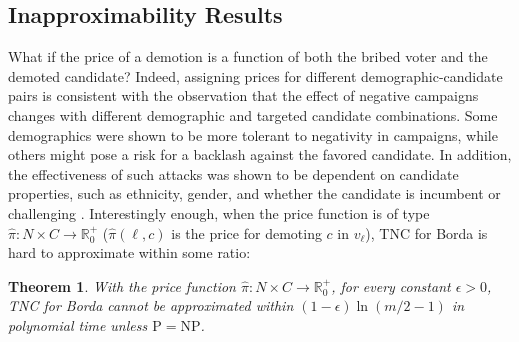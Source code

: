 \documentclass[letterpaper]{article} %
\newtheorem{theorem}{Theorem}
\newcommand{\preals}{\mathbb{R}^{+}_{0}}
\newcommand{\SB}{\textsc{TNC}}
\newcommand{\NP}{\mathrm{NP}}
\newcommand{\Pclass}{\mathrm{P}}
\begin{document}
\subsection{Inapproximability Results \label{inaprox}}
What if the price of a demotion is a function of both the bribed voter and the demoted candidate? Indeed, assigning prices for different demographic-candidate pairs is consistent with the observation that the effect of negative campaigns changes with different  demographic and targeted candidate combinations. Some demographics were shown to be more tolerant to negativity in campaigns, while others might pose a risk for a backlash against the favored candidate. In addition, the effectiveness of such attacks was shown to be dependent on candidate properties, such as ethnicity, gender, and whether the candidate is  incumbent or challenging \cite{fridkin2011variability}.
Interestingly enough, when the price function is of type $\hat{\pi}\colon N \times C \to \preals$  ($\hat{\pi}(\ell,c)$ is the price for demoting $c$ in $v_\ell$), \SB{} for Borda is hard to approximate within some ratio:
\begin{theorem}
With the price function $\hat{\pi}\colon N \times C \to \preals$, for every constant $\epsilon >0$, \SB{} for Borda cannot be approximated within $(1-\epsilon) \ln (m/2-1)$ in polynomial time unless $\Pclass = \NP$.
\end{theorem}
\end{document}

